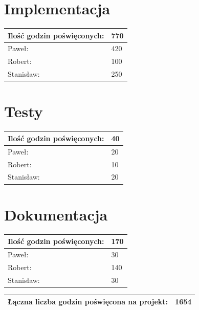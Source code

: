 \documentclass[a4paper,11pt]{report}
\begin{document}
\section{Implementacja}
\begin{tabular}{|l|l|}
\hline
Ilość godzin poświęconych: & 770\\
\hline
Paweł: & 420\\
\hline
Robert: & 100\\
\hline
Stanisław: & 250\\
\hline
\end{tabular}

\section{Testy}
\begin{tabular}{|l|l|}
\hline
Ilość godzin poświęconych: & 40\\
\hline
Paweł: & 20\\
\hline
Robert: & 10\\
\hline
Stanisław: & 20\\
\hline
\end{tabular}

\section{Dokumentacja}
\begin{tabular}{|l|l|}
\hline
Ilość godzin poświęconych: & 170\\
\hline
Paweł: & 30\\
\hline
Robert: & 140\\
\hline
Stanisław: & 30\\
\hline
\end{tabular}
\vspace{1cm}

\begin{tabular}{|l|l|}
\hline
Łączna liczba godzin poświęcona na projekt: & 1654\\
\hline
\end{tabular}
\end{document}

